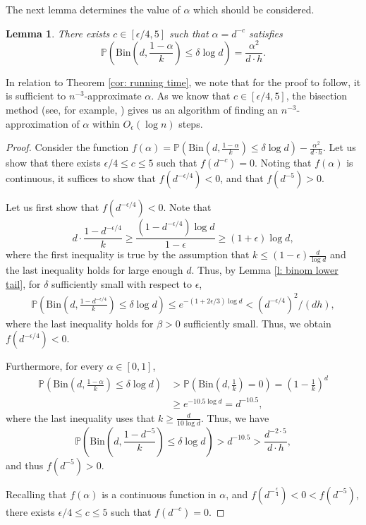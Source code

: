 \documentclass[notitlepage]{scrartcl}
\newtheorem{lemma}[thm]{Lemma}
\begin{document}
The next lemma determines the value of $\alpha$ which should be considered.
\begin{lemma}\label{l:alpha-choice}
There exists $c \in [\epsilon/4, 5]$ such that $\alpha = d^{-c}$ satisfies
\[
        \mathbb{P}\left(\text{Bin}\left(d, \frac{1 - \alpha}{k}\right) \le \delta \log d\right) = \frac{\alpha^2}{d\cdot h}.
\]
\end{lemma}
In relation to Theorem \ref{cor: running time}, we note that for the proof to follow, it is sufficient to $n^{-3}$-approximate $\alpha$. As we know that $c\in [\epsilon/4,5]$, the bisection method   (see, for example, \cite{BF93}) gives us an algorithm of finding an $n^{-3}$-approximation of $\alpha$ within $O_{\epsilon}(\log n)$ steps.  
\begin{proof}
Consider the function $f(\alpha) = \mathbb{P}\left(\text{Bin}\left(d, \frac{1 - \alpha}{k}\right) \le \delta \log d\right) - \frac{\alpha^2}{d \cdot h}$. Let us show that there exists $\epsilon/4 \le c\le 5$ such that $f(d^{-c}) = 0$. Noting that $f(\alpha)$ is continuous, it suffices to show that $f\left(d^{-\epsilon/4}\right)<0$, and that $f\left(d^{-5}\right)>0$.


Let us first show that $f(d^{-\epsilon/4}) < 0$. Note that $$d\cdot \frac{1-d^{-\epsilon/4}}{k}\ge \frac{(1-d^{-\epsilon/4})\log d}{1-\epsilon}\ge (1+\epsilon)\log d,$$
where the first inequality is true by the assumption that $k \le (1-\epsilon) \frac{d}{\log d}$ and the last inequality holds for large enough $d$. Thus, by Lemma \ref{l: binom lower tail}, for $\delta$ sufficiently small with respect to $\epsilon$,
\begin{align*}
    \mathbb{P}\left(\text{Bin}\left(d, \frac{1-d^{-\epsilon/4}}{k}\right) \le \delta \log d\right)\le e^{-(1+2\epsilon/3)\log d}<\left(d^{-\epsilon/4}\right)^2/(dh),
\end{align*}
where the last inequality holds for $\beta>0$ sufficiently small. Thus, we obtain $f\left(d^{-\epsilon / 4}\right) < 0$.
        
Furthermore, for every $\alpha \in [0,1]$,
\begin{align*}
    \mathbb{P}\left(\text{Bin}\left(d, \frac{1 - \alpha}{k}\right) \le \delta \log d\right)& > \mathbb{P}\left(\text{Bin}\left(d, \frac{1}{k}\right)=0\right) =\left(1 - \frac{1}{k}\right)^{d}\\
    &\ge e^{-10.5\log d} = d^{-10.5},
\end{align*}
where the last inequality uses that $k\ge \frac{d}{10\log d}$. Thus, we have
\[
    \mathbb{P}\left(\text{Bin}\left(d, \frac{1 - d^{-5}}{k}\right) \le \delta \log d\right)> d^{-10.5}
    >\frac{d^{-2\cdot 5}}{d\cdot h},
\]
and thus $f(d^{-5}) > 0$.

Recalling that  $f(\alpha)$ is a continuous function in $\alpha$, and $f(d^{-\frac{\epsilon}{4}}) < 0 < f(d^{-5})$, there exists $\epsilon/4 \le c \le 5$ such that $f(d^{-c}) = 0$.     
\end{proof}
\end{document}
